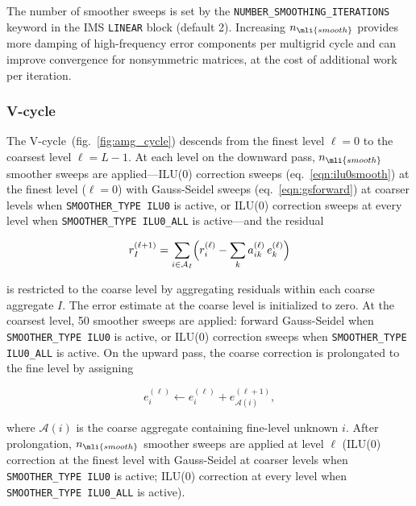 The number of smoother sweeps is set by the \texttt{NUMBER\_SMOOTHING\_ITERATIONS} keyword in the IMS \texttt{LINEAR} block (default 2). Increasing $n_{\mli{smooth}}$ provides more damping of high-frequency error components per multigrid cycle and can improve convergence for nonsymmetric matrices, at the cost of additional work per iteration.

\subsubsection{V-cycle}

The V-cycle~(fig.~\ref{fig:amg_cycle}) descends from the finest level $\ell = 0$ to the coarsest level $\ell = L - 1$. At each level on the downward pass, $n_{\mli{smooth}}$ smoother sweeps are applied---ILU(0) correction sweeps (eq.~\ref{eqn:ilu0smooth}) at the finest level ($\ell = 0$) with Gauss-Seidel sweeps (eq.~\ref{eqn:gsforward}) at coarser levels when \texttt{SMOOTHER\_TYPE ILU0} is active, or ILU(0) correction sweeps at every level when \texttt{SMOOTHER\_TYPE ILU0\_ALL} is active---and the residual

\begin{equation}
  \label{eqn:amgrestrict}
  r_I^{(\ell+1)} = \sum_{i \in \mathcal{A}_I}
    \Bigl( r_i^{(\ell)} - \sum_{k} a_{ik}^{(\ell)}\, e_k^{(\ell)} \Bigr)
\end{equation}

\noindent is restricted to the coarse level by aggregating residuals within each coarse aggregate $I$. The error estimate at the coarse level is initialized to zero. At the coarsest level, 50 smoother sweeps are applied: forward Gauss-Seidel when \texttt{SMOOTHER\_TYPE ILU0} is active, or ILU(0) correction sweeps when \texttt{SMOOTHER\_TYPE ILU0\_ALL} is active. On the upward pass, the coarse correction is prolongated to the fine level by assigning

\begin{equation}
  \label{eqn:amgprolong}
  e_i^{(\ell)} \leftarrow e_i^{(\ell)} + e_{\mathcal{A}(i)}^{(\ell+1)} ,
\end{equation}

\noindent where $\mathcal{A}(i)$ is the coarse aggregate containing fine-level unknown $i$. After prolongation, $n_{\mli{smooth}}$ smoother sweeps are applied at level $\ell$ (ILU(0) correction at the finest level with Gauss-Seidel at coarser levels when \texttt{SMOOTHER\_TYPE ILU0} is active; ILU(0) correction at every level when \texttt{SMOOTHER\_TYPE ILU0\_ALL} is active).

